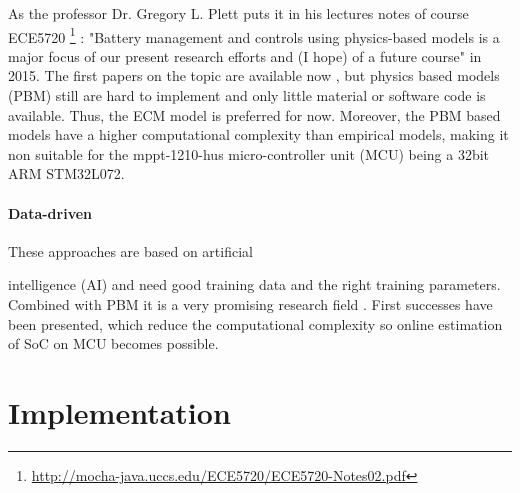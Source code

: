 As the professor Dr. Gregory L. Plett puts it in his lectures notes of course ECE5720  \footnote{ \url{http://mocha-java.uccs.edu/ECE5720/ECE5720-Notes02.pdf}} :  "Battery management and controls using physics-based models is a major focus of our present research efforts and (I hope) of a future
course" in 2015. The first papers on the topic are available now \cite{9477587}, but physics based models (PBM) still are hard to implement and only little material or software code is available. Thus, the ECM model is preferred for now. Moreover, the PBM based models have a higher computational complexity than
empirical models, making it non suitable for the mppt-1210-hus micro-controller unit (MCU) being a 32bit ARM STM32L072. %


\subsubsection{Data-driven}
\label{section:Data-driven}

These approaches are based on artificial

intelligence (AI) and need good training data and the right training parameters. Combined with PBM it is a very promising research field \cite{9477587}. First successes have been presented, which reduce the computational complexity so online estimation of SoC on MCU becomes possible.
\chapter{Implementation}
\label{chap:Implementation}


